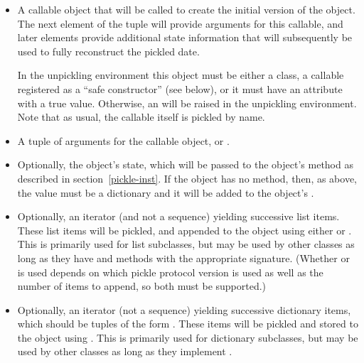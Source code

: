 \begin{itemize}

\item A callable object that will be called to create the initial
version of the object.  The next element of the tuple will provide
arguments for this callable, and later elements provide additional
state information that will subsequently be used to fully reconstruct
the pickled date.

In the unpickling environment this object must be either a class, a
callable registered as a ``safe constructor'' (see below), or it must
have an attribute  with a true value.
Otherwise, an  will be raised in the
unpickling environment.  Note that as usual, the callable itself is
pickled by name.

\item A tuple of arguments for the callable object, or .

\item Optionally, the object's state, which will be passed to
      the object's  method as described in
      section~\ref{pickle-inst}.  If the object has no
       method, then, as above, the value must
      be a dictionary and it will be added to the object's
      .

\item Optionally, an iterator (and not a sequence) yielding successive
list items.  These list items will be pickled, and appended to the
object using either  or
.  This is primarily used for
list subclasses, but may be used by other classes as long as they have
 and  methods with the appropriate
signature.  (Whether  or  is used
depends on which pickle protocol version is used as well as the number
of items to append, so both must be supported.)

\item Optionally, an iterator (not a sequence)
yielding successive dictionary items, which should be tuples of the
form .  These items will be pickled
and stored to the object using .
This is primarily used for dictionary subclasses, but may be used by
other classes as long as they implement .

\end{itemize}

